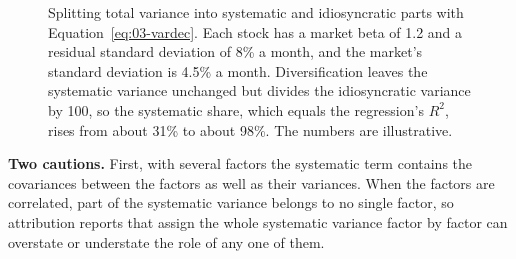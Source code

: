 \begin{figure}[!htbp]
  \centering
  \caption{Splitting total variance into systematic and idiosyncratic parts with Equation~\eqref{eq:03-vardec}. Each stock has a market beta of 1.2 and a residual standard deviation of 8\% a month, and the market's standard deviation is 4.5\% a month. Diversification leaves the systematic variance unchanged but divides the idiosyncratic variance by 100, so the systematic share, which equals the regression's $R^2$, rises from about 31\% to about 98\%. The numbers are illustrative.}
  \label{fig:03-vardec}
\end{figure}

\textbf{Two cautions.} First, with several factors the systematic term contains the covariances between the factors as well as their variances. When the factors are correlated, part of the systematic variance belongs to no single factor, so attribution reports that assign the whole systematic variance factor by factor can overstate or understate the role of any one of them.

